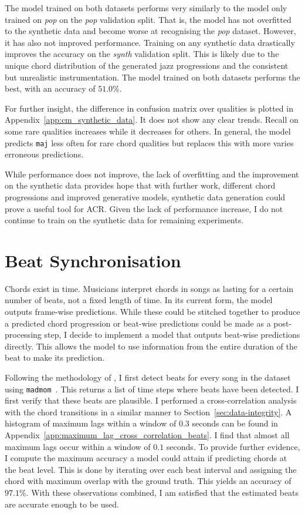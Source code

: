 The model trained on both datasets performs very similarly to the model only trained on \emph{pop} on the \emph{pop} validation split. That is, the model has not overfitted to the synthetic data and become worse at recognising the \emph{pop} dataset. However, it has also not improved performance. Training on any synthetic data drastically improves the accuracy on the \emph{synth} validation split. This is likely due to the unique chord distribution of the generated jazz progressions and the consistent but unrealistic instrumentation. The model trained on both datasets performs the best, with an accuracy of $51.0\%$.

For further insight, the difference in confusion matrix over qualities is plotted in Appendix~\ref{app:cm_synthetic_data}. It does not show any clear trends. Recall on some rare qualities increases while it decreases for others. In general, the model predicts \texttt{maj} less often for rare chord qualities but replaces this with more varies erroneous predictions.

While performance does not improve, the lack of overfitting and the improvement on the synthetic data provides hope that with further work, different chord progressions and improved generative models, synthetic data generation could prove a useful tool for ACR. Given the lack of performance increase, I do not continue to train on the synthetic data for remaining experiments.

\section{Beat Synchronisation}\label{sec:beat-synchronisation}

Chords exist in time. Musicians interpret chords in songs as lasting for a certain number of beats, not a fixed length of time. In its current form, the model outputs frame-wise predictions. While these could be stitched together to produce a predicted chord progression or beat-wise predictions could be made as a post-processing step, I decide to implement a model that outputs beat-wise predictions directly. This allows the model to use information from the entire duration of the beat to make its prediction.

Following the methodology of \citet{MelodyTranscriptionViaGenerativePreTraining}, I first detect beats for every song in the dataset using \texttt{madmom}~\citep{madmom}. This returns a list of time steps where beats have been detected. I first verify that these beats are plausible. I performed a cross-correlation analysis with the chord transitions in a similar manner to Section~\ref{sec:data-integrity}. A histogram of maximum lags within a window of $0.3$ seconds can be found in Appendix~\ref{app:maximum_lag_cross_correlation_beats}. I find that almost all maximum lags occur within a window of $0.1$ seconds. To provide further evidence, I compute the maximum accuracy a model could attain if predicting chords at the beat level. This is done by iterating over each beat interval and assigning the chord with maximum overlap with the ground truth. This yields an accuracy of $97.1\%$. With these observations combined, I am satisfied that the estimated beats are accurate enough to be used.

